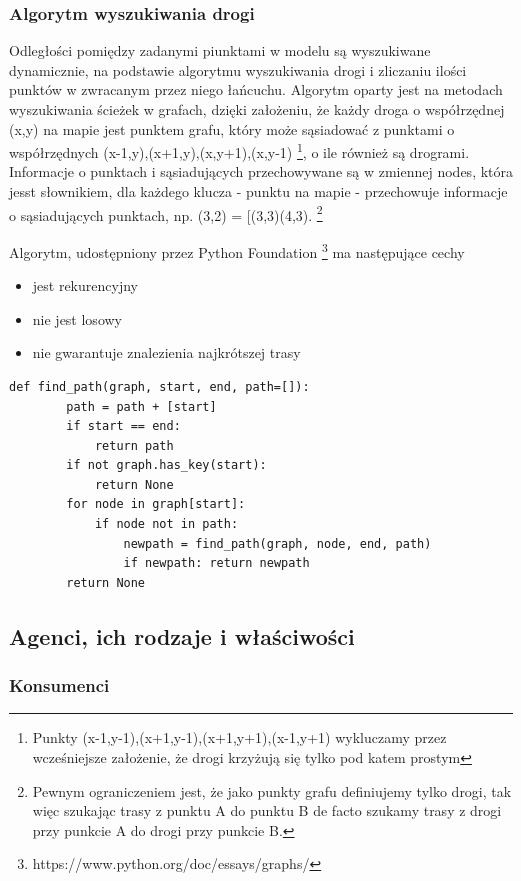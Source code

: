 \documentclass{article}
\begin{document}
\subsubsection{Algorytm wyszukiwania drogi} 

Odległości pomiędzy zadanymi piunktami w modelu są wyszukiwane dynamicznie, na podstawie algorytmu wyszukiwania drogi i zliczaniu ilości punktów w zwracanym przez niego łańcuchu. Algorytm oparty jest na metodach wyszukiwania ścieżek w grafach, dzięki założeniu, że każdy droga o współrzędnej (x,y) na mapie jest punktem grafu, który może sąsiadować z punktami o współrzędnych (x-1,y),(x+1,y),(x,y+1),(x,y-1) \footnote{Punkty (x-1,y-1),(x+1,y-1),(x+1,y+1),(x-1,y+1) wykluczamy przez wcześniejsze założenie, że drogi krzyżują się tylko pod katem prostym}, o ile również są drogrami. Informacje o punktach i sąsiadujących przechowywane są w zmiennej nodes, która jesst słownikiem, dla każdego klucza - punktu na mapie - przechowuje informacje o sąsiadujących punktach, np. (3,2) = [(3,3)(4,3). \footnote{Pewnym ograniczeniem jest, że jako punkty grafu definiujemy tylko drogi, tak więc szukając trasy z punktu A do punktu B de facto szukamy trasy z drogi przy punkcie A do drogi przy punkcie B.}

Algorytm, udostępniony przez Python Foundation \footnote{https://www.python.org/doc/essays/graphs/} ma następujące cechy

	\begin{itemize}
		\item jest rekurencyjny
		\item nie jest losowy
		\item nie gwarantuje znalezienia najkrótszej trasy
	\end{itemize}

\begin{lstlisting}[frame=single]  
    def find_path(graph, start, end, path=[]):
        path = path + [start]
        if start == end:
            return path
        if not graph.has_key(start):
            return None
        for node in graph[start]:
            if node not in path:
                newpath = find_path(graph, node, end, path)
                if newpath: return newpath
        return None
\end{lstlisting}

\subsection{Agenci, ich rodzaje i właściwości}
\subsubsection{Konsumenci} 
\end{document}
